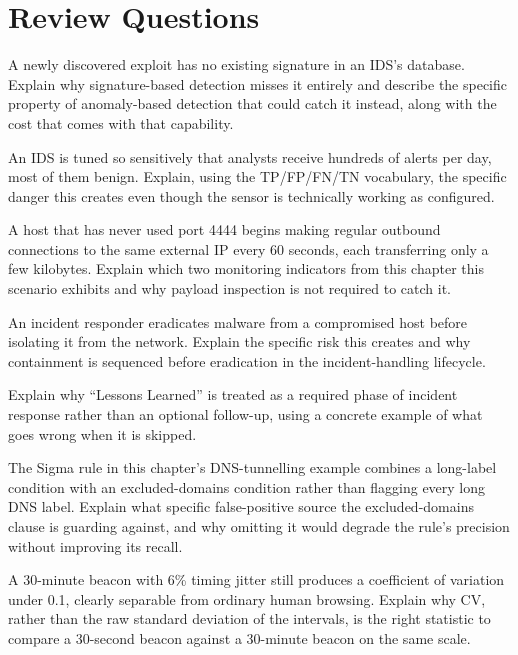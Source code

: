 \section*{Review Questions}
\begin{reviewquestions}
\item A newly discovered exploit has no existing signature in an IDS's database. Explain why
signature-based detection misses it entirely and describe the specific property of anomaly-based
detection that could catch it instead, along with the cost that comes with that capability.
\item An IDS is tuned so sensitively that analysts receive hundreds of alerts per day, most of them
benign. Explain, using the TP/FP/FN/TN vocabulary, the specific danger this creates even though the
sensor is technically working as configured.
\item A host that has never used port 4444 begins making regular outbound connections to the same
external IP every 60 seconds, each transferring only a few kilobytes. Explain which two monitoring
indicators from this chapter this scenario exhibits and why payload inspection is not required to
catch it.
\item An incident responder eradicates malware from a compromised host before isolating it from the
network. Explain the specific risk this creates and why containment is sequenced before eradication
in the incident-handling lifecycle.
\item Explain why ``Lessons Learned'' is treated as a required phase of incident response rather
than an optional follow-up, using a concrete example of what goes wrong when it is skipped.
\item The Sigma rule in this chapter's DNS-tunnelling example combines a long-label condition with
an excluded-domains condition rather than flagging every long DNS label. Explain what specific
false-positive source the excluded-domains clause is guarding against, and why omitting it would
degrade the rule's precision without improving its recall.
\item A 30-minute beacon with 6\% timing jitter still produces a coefficient of variation under
0.1, clearly separable from ordinary human browsing. Explain why CV, rather than the raw standard
deviation of the intervals, is the right statistic to compare a 30-second beacon against a
30-minute beacon on the same scale.
\end{reviewquestions}

